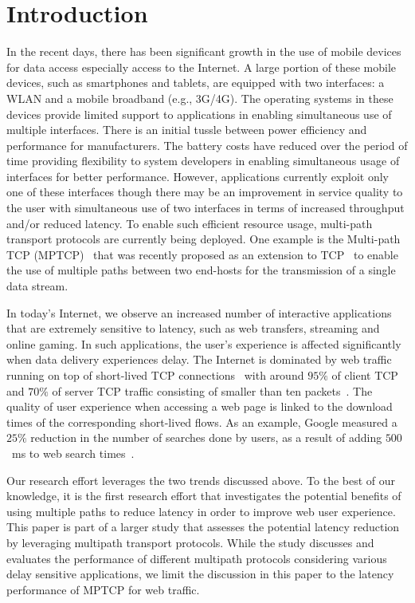 \section{Introduction}
\label{sec:introduction}
In the recent days, there has been significant growth in the use of mobile devices for data access especially access to the Internet.
A large portion of these mobile devices, such as smartphones and tablets, are equipped with two interfaces: a WLAN and a mobile broadband
(e.g., 3G/4G). The operating systems in these devices provide limited support to applications in enabling simultaneous use of
multiple interfaces. There is an initial tussle between power efficiency and performance for manufacturers. The battery costs
have reduced over the period of time providing flexibility to system developers in enabling simultaneous usage of interfaces for 
better performance. However, applications currently exploit only one of these interfaces though there may be an improvement in service
quality to the user with simultaneous use of two interfaces in terms of increased throughput and/or reduced latency. 
To enable such efficient resource usage, multi-path transport protocols are currently being deployed. 
One example is the Multi-path TCP (MPTCP)~\cite{RFC6824} that was recently proposed as an extension to
TCP~\cite{RFC793} to enable the use of multiple paths between two end-hosts for the transmission of a single data stream.

In today's Internet, we observe an increased number of interactive applications that are extremely sensitive to latency, such as web transfers, 
streaming and online gaming. In such applications, the user's experience is affected significantly when data delivery experiences delay. 
The Internet is dominated by web traffic running on top of short-lived TCP connections~\cite{Labovitz-IOR-2009} with
around $95\%$ of client TCP and $70\%$ of server TCP traffic consisting of smaller than ten packets~\cite{Ciullo-IEEECL-2009}.
The quality of user experience when accessing a web page is linked to the download times of the corresponding short-lived flows. As an example,
Google measured a $25\%$ reduction in the number of searches done by users, as a result of adding 
$500$~ms to web search times~\cite{why-latency-matters-2013}.

Our research effort leverages the two trends discussed above. To the best of our knowledge, it is the first research effort that investigates 
the potential benefits of using multiple paths to reduce latency in order to 
improve web user experience. This paper is part of a larger study that assesses the potential latency reduction by leveraging multipath transport protocols. 
While the study discusses and evaluates the performance of different multipath protocols considering various delay sensitive applications, we limit the 
discussion in this paper to the latency performance of MPTCP for web traffic.

